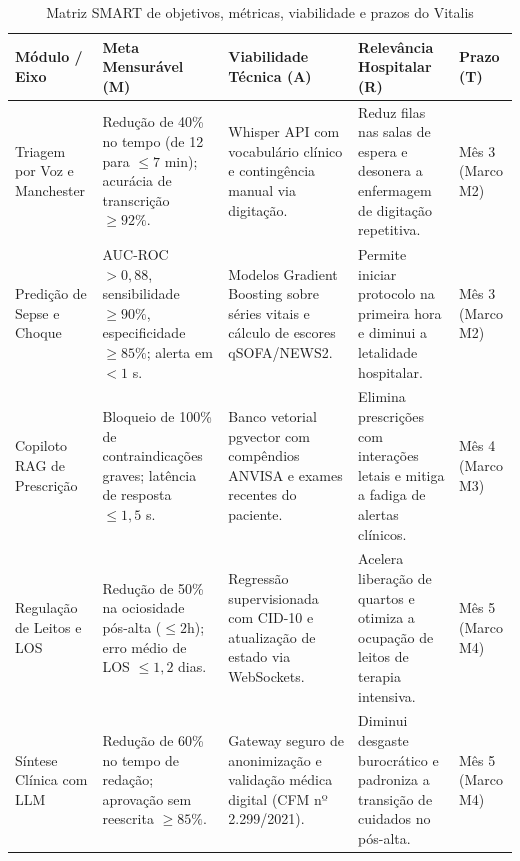 \begin{table}[!htbp]
\centering
\small
\setlength{\tabcolsep}{4.5pt}
\caption{Matriz SMART de objetivos, métricas, viabilidade e prazos do Vitalis}
\label{tab:matriz_smart}
\begin{tabularx}{\textwidth}{>{\raggedright\arraybackslash}p{2.3cm} >{\raggedright\arraybackslash}p{2.9cm} >{\raggedright\arraybackslash}p{2.9cm} >{\raggedright\arraybackslash}X >{\raggedright\arraybackslash}p{1.8cm}}
\toprule
\textbf{Módulo / Eixo} & \textbf{Meta Mensurável (M)} & \textbf{Viabilidade Técnica (A)} & \textbf{Relevância Hospitalar (R)} & \textbf{Prazo (T)} \\
\midrule
Triagem por Voz e Manchester &
Redução de 40\% no tempo (de 12 para $\le 7$ min); acurácia de transcrição $\ge 92\%$. &
Whisper API com vocabulário clínico e contingência manual via digitação. &
Reduz filas nas salas de espera e desonera a enfermagem de digitação repetitiva. &
Mês 3 \newline (Marco M2) \\
\addlinespace
Predição de Sepse e Choque &
AUC-ROC $> 0{,}88$, sensibilidade $\ge 90\%$, especificidade $\ge 85\%$; alerta em $< 1$ s. &
Modelos Gradient Boosting sobre séries vitais e cálculo de escores qSOFA/NEWS2. &
Permite iniciar protocolo na primeira hora e diminui a letalidade hospitalar. &
Mês 3 \newline (Marco M2) \\
\addlinespace
Copiloto RAG de Prescrição &
Bloqueio de 100\% de contraindicações graves; latência de resposta $\le 1{,}5$ s. &
Banco vetorial pgvector com compêndios ANVISA e exames recentes do paciente. &
Elimina prescrições com interações letais e mitiga a fadiga de alertas clínicos. &
Mês 4 \newline (Marco M3) \\
\addlinespace
Regulação de Leitos e LOS &
Redução de 50\% na ociosidade pós-alta ($\le 2$h); erro médio de LOS $\le 1{,}2$ dias. &
Regressão supervisionada com CID-10 e atualização de estado via WebSockets. &
Acelera liberação de quartos e otimiza a ocupação de leitos de terapia intensiva. &
Mês 5 \newline (Marco M4) \\
\addlinespace
Síntese Clínica com LLM &
Redução de 60\% no tempo de redação; aprovação sem reescrita $\ge 85\%$. &
Gateway seguro de anonimização e validação médica digital (CFM nº 2.299/2021). &
Diminui desgaste burocrático e padroniza a transição de cuidados no pós-alta. &
Mês 5 \newline (Marco M4) \\

\end{tabularx}
\end{table}
